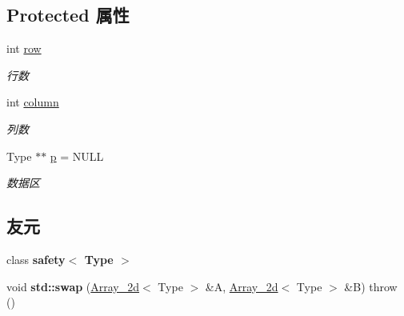 \subsection*{Protected 属性}
\begin{DoxyCompactItemize}
\item 
\mbox{\label{classarray__2d_1_1_array__2d_a17b90b53a8e0002452e96c2b7f74820b}} 
int \hyperlink{classarray__2d_1_1_array__2d_a17b90b53a8e0002452e96c2b7f74820b}{row}
\begin{DoxyCompactList}\small\item\em 行数 \end{DoxyCompactList}\item 
\mbox{\label{classarray__2d_1_1_array__2d_abdf56a1c0f22088353d9a32de9680d76}} 
int \hyperlink{classarray__2d_1_1_array__2d_abdf56a1c0f22088353d9a32de9680d76}{column}
\begin{DoxyCompactList}\small\item\em 列数 \end{DoxyCompactList}\item 
\mbox{\label{classarray__2d_1_1_array__2d_acff90ef50db842de715aa8cc54954edf}} 
Type $\ast$$\ast$ \hyperlink{classarray__2d_1_1_array__2d_acff90ef50db842de715aa8cc54954edf}{p} = N\+U\+LL
\begin{DoxyCompactList}\small\item\em 数据区 \end{DoxyCompactList}\end{DoxyCompactItemize}
\subsection*{友元}
\begin{DoxyCompactItemize}
\item 
\mbox{\label{classarray__2d_1_1_array__2d_aafc5f052cec930e9a947de7ae427854f}} 
class {\bfseries safety$<$ Type $>$}
\item 
\mbox{\label{classarray__2d_1_1_array__2d_aa92bc2279dec8fb44df049a9eb36c8a4}} 
void {\bfseries std\+::swap} (\hyperlink{classarray__2d_1_1_array__2d}{Array\+\_\+2d}$<$ Type $>$ \&A, \hyperlink{classarray__2d_1_1_array__2d}{Array\+\_\+2d}$<$ Type $>$ \&B)  throw ()
\end{DoxyCompactItemize}


